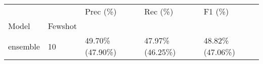 \begin{tabular}{lllll}
\toprule
         &    &         Prec (\%) &          Rec (\%) &           F1 (\%) \\
Model & Fewshot &                  &                  &                  \\
\midrule
ensemble & 10 &  49.70\% (47.90\%) &  47.97\% (46.25\%) &  48.82\% (47.06\%) \\
\bottomrule
\end{tabular}
